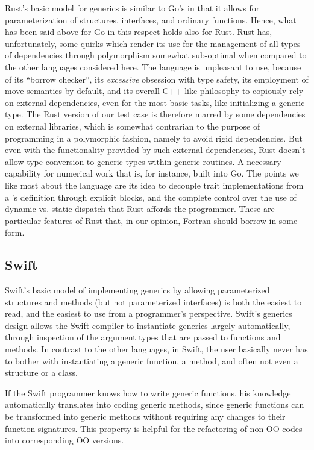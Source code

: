 \documentclass[11pt,oneside]{report}
\newcommand{\code}[1]{{\selectfont\ttfamily{#1}}}
\begin{document}
Rust's basic model for generics is similar to Go's in that it allows
for parameterization of structures, interfaces, and ordinary
functions. Hence, what has been said above for Go in this respect
holds also for Rust. Rust has, unfortunately, some quirks which render
its use for the management of all types of dependencies through
polymorphism somewhat sub-optimal when compared to the other languages
considered here. The language is unpleasant to use, because of its
``borrow checker'', its \emph{excessive} obsession with type safety,
its employment of move semantics by default, and its overall C++-like
philosophy to copiously rely on external dependencies, even for the
most basic tasks, like initializing a generic type. The Rust version
of our test case is therefore marred by some dependencies on external
libraries, which is somewhat contrarian to the purpose of programming
in a polymorphic fashion, namely to avoid rigid dependencies. But even
with the functionality provided by such external dependencies, Rust
doesn't allow type conversion to generic types within generic
routines. A necessary capability for numerical work that is, for
instance, built into Go. The points we like most about the language
are its idea to decouple trait implementations from a \code{struct}'s
definition through explicit \code{impl} blocks, and the complete
control over the use of dynamic vs. static dispatch that Rust affords
the programmer. These are particular features of Rust that, in our
opinion, Fortran should borrow in some form.

\subsection{Swift}

Swift's basic model of implementing generics by allowing parameterized
structures and methods (but not parameterized interfaces) is both the
easiest to read, and the easiest to use from a programmer's
perspective. Swift's generics design allows the Swift compiler to
instantiate generics largely automatically, through inspection of the
argument types that are passed to functions and methods. In contrast
to the other languages, in Swift, the user basically never has to
bother with instantiating a generic function, a method, and often not
even a structure or a class.

If the Swift programmer knows how to write generic functions, his
knowledge automatically translates into coding generic methods, since
generic functions can be transformed into generic methods without
requiring any changes to their function signatures. This property is
helpful for the refactoring of non-OO codes into corresponding OO
versions.
\end{document}
